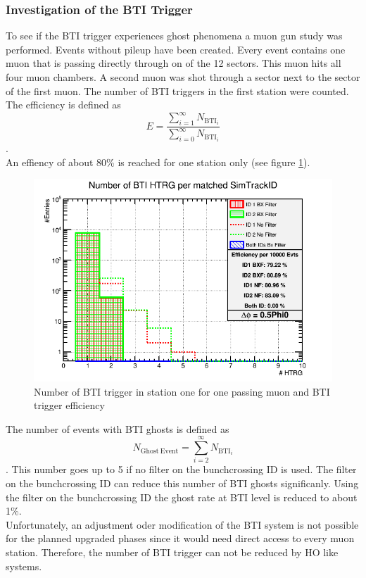 \subsubsection{Investigation of the BTI Trigger}
To see if the BTI trigger experiences ghost phenomena a muon gun study was performed. Events without pileup have been created. Every event contains one muon that is passing directly through on of the 12 sectors. This muon hits all four muon chambers. A second muon was shot through a sector next to the sector of the first muon. The number of BTI triggers in the first station were counted.\\
The efficiency is defined as
\begin{equation}
E=\frac{\sum_{i = 1}^\infty N_{\mathrm{BTI}_i}}{\sum_{i = 0}^\infty N_{\mathrm{BTI}_i}}
\end{equation}.\\
An effiency of about 80\% is reached for one station only (see figure \ref{BTIEfficiency}).
\begin{figure}
\begin{minipage}[t]{0.95\textwidth}
\includegraphics[width=\textwidth]{Figures/scheuch/SectorGunPt100dPhi0_5Phi0_h1dFilteredBtiHitsPerEvtSL1.png}
\caption{Number of BTI trigger in station one for one passing muon and BTI trigger efficiency}
\label{BTIEfficiency}
\end{minipage}
\end{figure}
The number of events with BTI ghosts is defined as
\begin{equation}
N_{\mathrm{Ghost\ Event}} = \sum_{i = 2}^\infty N_{\mathrm{BTI}_i}
\end{equation}.
This number goes up to 5 if no filter on the bunchcrossing ID is used. The filter on the bunchcrossing ID can reduce this number of BTI ghosts significanly. Using the filter on the bunchcrossing ID the ghost rate at BTI level is reduced to about 1\%.\\
Unfortunately, an adjustment oder modification of the BTI system is not possible for the planned upgraded phases since it would need direct access to every muon station. Therefore, the number of BTI trigger can not be reduced by HO like systems.